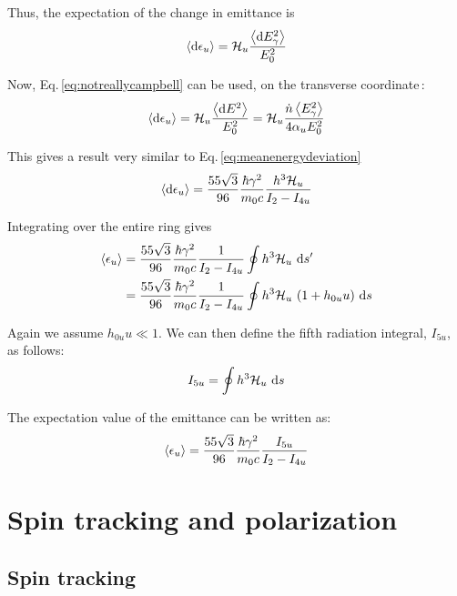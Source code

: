 Thus, the expectation of the change in emittance is
\begin{equation}
    \left\langle {\text{d}\epsilon_u} \right\rangle = \mathcal{H}_u \frac{\left\langle {\text{d}E_\gamma^2} \right\rangle}{E_0^2}
\end{equation}

Now, Eq.\,\ref{eq:notreallycampbell} can be used, on the transverse coordinate\,\cite{hofmann_2004}:
\begin{equation}
    \left\langle {\text{d}\epsilon_u} \right\rangle = \mathcal{H}_u \frac{\left\langle {\text{d}E^2} \right\rangle}{E_0^2}
    = \mathcal{H}_u \frac{\dot{n} \left\langle {E_\gamma^2} \right\rangle}{4 \alpha_u E_0^2}
\end{equation}

This gives a result very similar to Eq.\,\ref{eq:meanenergydeviation}
\begin{equation}
\left\langle {\text{d}\epsilon_u} \right\rangle = \frac{55 \sqrt{3}}{96} \frac{\hbar \gamma^2}{m_0 c} \frac{h^3 \mathcal{H}_u}{I_2 - I_{4u}}
\end{equation}

Integrating over the entire ring gives
\begin{align}
    \left\langle {\epsilon_u} \right\rangle &= \frac{55 \sqrt{3}}{96} \frac{\hbar \gamma^2}{m_0 c}
    \frac{1}{I_2 - I_{4u}}\oint h^3 \mathcal{H}_u\ \text{d} s'\notag\\
    &= \frac{55 \sqrt{3}}{96} \frac{\hbar \gamma^2}{m_0 c}
    \frac{1}{I_2 - I_{4u}}\oint h^3 \mathcal{H}_u\ (1 + h_{0u}u)\ \text{d} s
\end{align}

Again we assume $h_{0u} u \ll 1$. We can then define the fifth radiation integral, $I_{5u}$, as follows:
\begin{equation}
    I_{5u} = \oint h^3 \curlyH_u\ \dee s
\end{equation}

The expectation value of the emittance can be written as:
\begin{equation}
    \left\langle {\epsilon_u} \right\rangle = \frac{55 \sqrt{3}}{96} \frac{\hbar \gamma^2}{m_0 c} \frac{I_{5u}}{I_2 - I_{4u}}
\end{equation}



\chapter{Spin tracking and polarization}

\section{Spin tracking}


